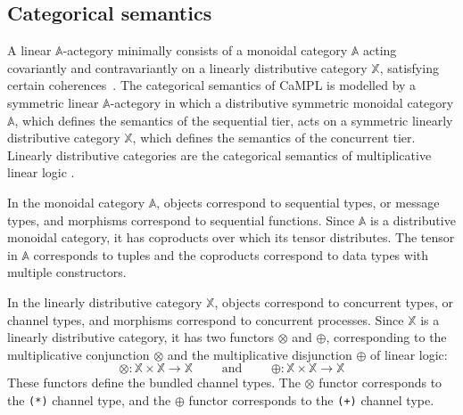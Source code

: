 \documentclass[acmsmall]{acmart}
\begin{document}
\subsection{Categorical semantics}


A linear $\mathbb{A}$-actegory minimally consists of a monoidal category $\mathbb{A}$ acting covariantly and contravariantly on a linearly distributive category 
$\mathbb{X}$, satisfying certain coherences~\cite{CoP07, CS97}. 
The categorical semantics of CaMPL is modelled by a symmetric linear $\mathbb{A}$-actegory in which a distributive symmetric monoidal category $\mathbb{A}$, which defines the semantics of the sequential tier, acts on a symmetric linearly distributive category $\mathbb{X}$, which defines the semantics of the concurrent tier. Linearly distributive categories are the categorical semantics of multiplicative linear logic \cite{CS97, Sri21}. 

In the monoidal category $\mathbb{A}$, objects correspond to sequential types, or message types, and morphisms correspond to sequential functions.
Since $\mathbb{A}$ is a distributive monoidal category, it has coproducts over which its tensor distributes.
The tensor in $\mathbb{A}$ corresponds to tuples and the coproducts correspond to data types with multiple constructors.

In the linearly distributive category $\mathbb{X}$, objects correspond to concurrent types, or channel types, and morphisms correspond to concurrent processes.
Since $\mathbb{X}$ is a linearly distributive category, it has two functors $\otimes$ and $\oplus$, corresponding to the multiplicative conjunction $\otimes$ and the multiplicative disjunction $\oplus$ of linear logic:
\[ \otimes: \mathbb{X} \times \mathbb{X} \to \mathbb{X} \quad \quad \text{ and } \quad \quad \oplus: \mathbb{X} \times \mathbb{X} \to \mathbb{X}\]
These functors define the bundled channel types.
The \(\otimes\) functor corresponds to the \lstinline{(*)} channel type, and the \(\oplus\) functor corresponds to the  \lstinline{(+)} channel type.
\end{document}
